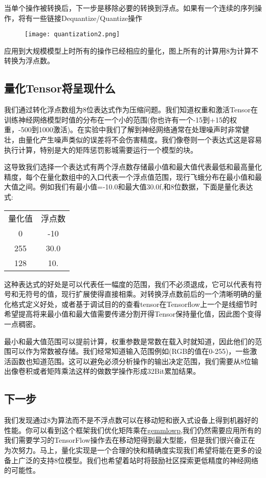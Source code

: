 当单个操作被转换后，下一步是移除必要的转换到浮点。如果有一个连续的序列操作，将有一些链接Dequantize/Quantize操作

\begin{center}
\begin{figure}[H]
\texttt{[image: quantization2.png]}
\end{figure}
\end{center}
应用到大规模模型上时所有的操作已经相应的量化，图上所有的计算用8为计算不转换为浮点数。
\subsection{量化Tensor将呈现什么}
我们通过转化浮点数组为8位表达式作为压缩问题。我们知道权重和激活Tensor在训练神经网络模型时值的分布在一个小的范围(你也许有一个-15到+15的权重，-500到1000激活)。在实验中我们了解到神经网络通常在处理噪声时非常健壮，由量化产生噪声类似的误差将不会伤害精度。我们像卷则一个表达式这是容易执行计算，特别是大的矩阵惩罚影城需要运行一个模型的块。

这导致我们选择一个表达式有两个浮点数存储最小值和最大值代表最低和最高量化精度，每个在量化数组中的入口代表一个浮点值范围，现行飞蛾分布在最小值和最大值之间。例如我们有最小值=-10.0和最大值30.0f,和8位数据，下面是量化表达式:\newline
\begin{tabular}{|c|c|}
量化值&浮点数\\
0&-10\\
255&30.0\\
128&10.
\end{tabular}
\newline
这种表达式的好处是可以代表任一幅度的范围，我们不必须退成，它可以代表有符号和无符号的值，现行扩展使得直接相乘。对转换浮点数前后的一个清晰明确的量化格式定义好处，或者基于调试目的的查看tensor在Tensorflow上一个是线细节时希望提高将来最小值和最大值需要传递分割开得Tensor保持量化值，因此图个变得一点稠密。

最小和最大值范围可以提前计算，权重参数是常数在载入时就知道，因此他们的范围可以作为常数被存储。我们经常知道输入范围例如(RGB的值在0-255)，一些激活函数也知道范围。这可以避免必须分析操作的输出决定范围，我们需要从8位输出像卷积或者矩阵乘法这样的做数学操作形成32Bit累加结果。
\subsection{下一步}
我们发现通过8为算法而不是不浮点数可以在移动短和嵌入式设备上得到机器好的性能。你可以看到这个框架我们优化矩阵乘在\href{https://github.com/google/gemmlowp}{gemmlowp},我们仍然需要应用所有的我们需要学习的TensorFlow操作去在移动短得到最大型能，但是我们很兴奋正在为次努力。马上，量化实现是一个合理的快和精确度实现我们希望将能在更多的设备上广泛的支持8位模型。我们也希望着站时将鼓励社区探索更低精度的神经网络的可能性。

